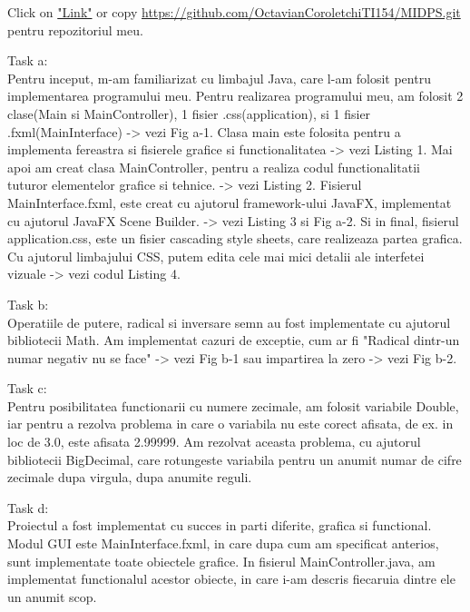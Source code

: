 Click on \href{https://github.com/OctavianCoroletchiTI154/MIDPS.git}{"Link"} or copy \url{https://github.com/OctavianCoroletchiTI154/MIDPS.git} pentru repozitoriul meu.
\par Task a: \\
Pentru inceput, m-am familiarizat cu limbajul Java, care l-am folosit pentru implementarea programului meu. Pentru realizarea programului meu, am folosit 2 clase(Main si MainController), 1 fisier .css(application), si 1 fisier .fxml(MainInterface) -> vezi Fig a-1. Clasa main este folosita pentru a implementa fereastra si fisierele grafice si functionalitatea -> vezi Listing 1. Mai apoi am creat clasa MainController, pentru a realiza codul functionalitatii tuturor elementelor grafice si tehnice. -> vezi Listing 2. Fisierul MainInterface.fxml, este creat cu ajutorul framework-ului JavaFX, implementat cu ajutorul JavaFX Scene Builder. -> vezi Listing 3 si Fig a-2. Si in final, fisierul application.css, este un fisier cascading style sheets, care realizeaza partea grafica. Cu ajutorul limbajului CSS, putem edita cele mai mici detalii ale interfetei vizuale -> vezi codul Listing 4.\\
\clearpage
\par Task b: \\
Operatiile de putere, radical si inversare semn au fost implementate cu ajutorul bibliotecii Math. Am implementat cazuri de exceptie, cum ar fi "Radical dintr-un numar negativ nu se face" -> vezi Fig b-1 sau impartirea la zero -> vezi Fig b-2.\\
\par Task c:\\
Pentru posibilitatea functionarii cu numere zecimale, am folosit variabile Double, iar pentru a rezolva problema in care o variabila nu este corect afisata, de ex. in loc de 3.0, este afisata 2.99999. Am rezolvat aceasta problema, cu ajutorul bibliotecii BigDecimal, care rotungeste variabila pentru un anumit numar de cifre zecimale dupa virgula, dupa anumite reguli.\\
\par Task d:\\
Proiectul a fost implementat cu succes in parti diferite, grafica si functional. Modul GUI este MainInterface.fxml, in care dupa cum am specificat anterios, sunt implementate toate obiectele grafice.
In fisierul MainController.java, am implementat functionalul acestor obiecte, in care i-am descris fiecaruia dintre ele un anumit scop.\\

